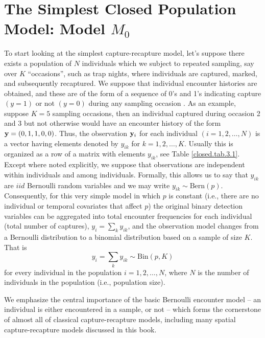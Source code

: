 \section{The Simplest Closed Population Model: Model $M_0$}

To start looking at the simplest capture-recapture model, let's suppose
there exists a population of $N$ individuals which we
subject to repeated sampling, say over $K$ ``occasions'', such as trap nights, where individuals
are captured, marked, and subsequently recaptured.  We suppose that
individual encounter histories are obtained, and these are of the form
of a sequence of 0's and 1's indicating capture $(y=1)$ or not $(y=0)$
during any sampling occasion%
.  As an example, suppose
$K=5$ sampling occasions, then an individual captured during occasion %
2 and 3 but not otherwise would have an encounter history of the form
${\bf y}=(0,1,1,0,0)$. Thus, the observation ${\bf y}_{i}$ for each
individual $(i=1,2,\hdots,N)$ is a vector having elements denoted by $y_{ik}$ for
$k=1,2,\hdots,K$. Usually this is organized as a row of a matrix with
elements $y_{ik}$, see Table \ref{closed.tab.3.1}. Except where noted
explicitly, we suppose that observations are independent within
individuals and among individuals.  Formally, this allows us to say
that $y_{ik}$ are $iid$ %
Bernoulli random variables and we may write $y_{ik}
\sim \mbox{Bern}(p)$.  Consequently, for this very simple model in
which $p$ is constant (i.e., there are no individual or temporal
covariates that affect $p$) the original binary detection variables
can be aggregated into total encounter frequencies for each individual
(total number of captures), $y_{i} = \sum_{k} y_{ik}$, and the
observation model changes from a Bernoulli distribution to a
binomial distribution based on a sample of size $K$. That is
\[
y_{i}  = \sum_{k} y_{ik} \sim \mbox{Bin}(p,K)
\]
for every individual in the population $i=1,2,\ldots,N$, where $N$ is
the number of individuals in the population (i.e., population size).

We emphasize the central importance of the basic Bernoulli encounter model
-- an individual is either encountered in a sample, or not --
 which forms
the cornerstone of almost all of classical
capture-recapture models, including many spatial capture-recapture
models discussed in this book.

